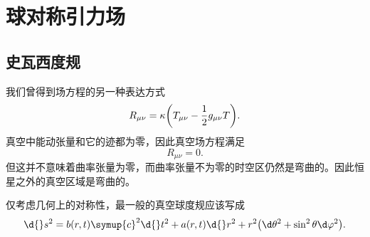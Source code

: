 \documentclass[UTF8, 12pt, a4paper, oneside, onecolumn, fontset=none]{ctexart}
\begin{document}
\newpage
\section{球对称引力场}
\subsection{史瓦西度规}
我们曾得到场方程的另一种表达方式
\begin{equation}
R_{\mu\nu}=\kappa\mleft(T_{\mu\nu}-\frac{1}{2}g_{\mu\nu}T\mright).
\end{equation}
真空中能动张量和它的迹都为零，因此真空场方程满足
\begin{equation}
R_{\mu\nu}=0.
\end{equation}
但这并不意味着曲率张量为零，而曲率张量不为零的时空区仍然是弯曲的。因此恒星之外的真空区域是弯曲的。

仅考虑几何上的对称性，最一般的真空球度规应该写成
\begin{equation}
\d{}s^{2}=b\mleft(r, t\mright)\symup{c}^{2}\d{}t^{2}+a\mleft(r, t\mright)\d{}r^{2}+r^{2}\mleft(\d\theta^{2}+\sin^{2}{\theta}\d\varphi^{2}\mright).
\end{equation}
\end{document}
